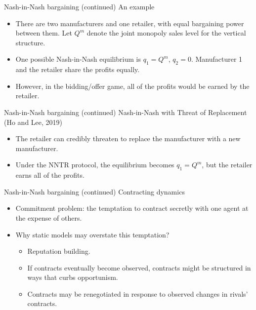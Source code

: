 \documentclass[aspectratio=169]{beamer}  %
\begin{document}
\begin{frame}{Nash-in-Nash bargaining (continued)}
    An example \vspace{.2cm}
    \begin{itemize}
        \item There are two manufacturers and one retailer, with equal bargaining power between them. Let $Q^m$ denote the joint monopoly sales level for the vertical structure. \vspace{.2cm}
        \item One possible Nash-in-Nash equilibrium is $q_1 = Q^m$, $q_2 = 0$. Manufacturer 1 and the retailer share the profits equally. \vspace{.2cm}
        \item However, in the bidding/offer game, all of the profits would be earned by the retailer. \vspace{.2cm}
    \end{itemize}
\end{frame}



\begin{frame}{Nash-in-Nash bargaining (continued)}
    Nash-in-Nash with Threat of Replacement (Ho and Lee, 2019) \vspace{.2cm}
    \begin{itemize}
        \item The retailer can credibly threaten to replace the manufacturer with a new manufacturer. \vspace{.2cm} 
        \item Under the NNTR protocol, the equilibrium becomes $q_1 = Q^m$, but the retailer earns all of the profits. \vspace{.2cm}
    \end{itemize}
\end{frame}


\begin{frame}{Nash-in-Nash bargaining (continued)}
    Contracting dynamics \vspace{.2cm}
    \begin{itemize}
        \item Commitment problem: the temptation to contract secretly with one agent at the expense of others. \vspace{.2cm}
        \item Why static models may overstate this temptation? \vspace{.2cm}
        \begin{itemize}
            \item Reputation building. \vspace{.2cm}
            \item If contracts eventually become observed, contracts might be
            structured in ways that curbs opportunism. \vspace{.2cm}
            \item Contracts may be renegotiated in response to observed changes in rivals' contracts.
        \end{itemize}
    \end{itemize}
\end{frame}
\end{document}
